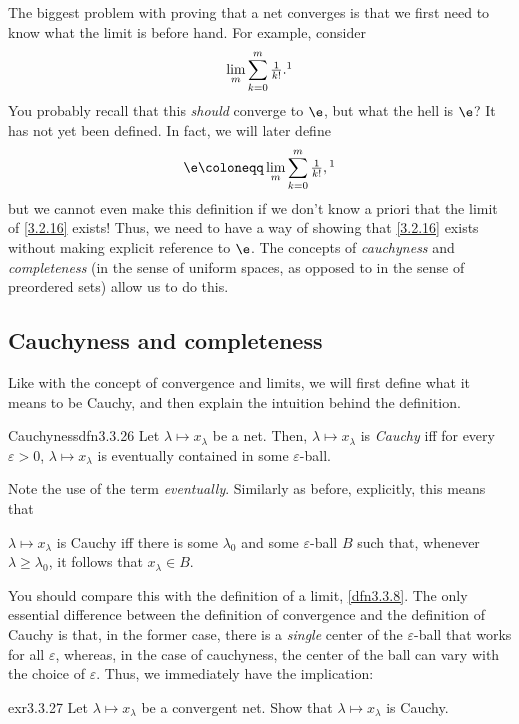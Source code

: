 The biggest problem with proving that a net converges is that we first need to know what the limit is before hand.  For example, consider
\begin{equation}\label{3.2.16}
\lim _m\sum _{k=0}^m\tfrac{1}{k!}.\footnotemark
\end{equation}
You probably recall that this \emph{should} converge to $\e$, but what the hell is $\e$?  It has not yet been defined.  In fact, we will later define
\begin{equation}
\e \coloneqq \lim _m\sum _{k=0}^m\tfrac{1}{k!},\footnotemark
\end{equation}
but we cannot even make this definition if we don't know a priori that the limit of \eqref{3.2.16} exists!  Thus, we need to have a way of showing that \eqref{3.2.16} exists without making explicit reference to $\e$.  The concepts of \emph{cauchyness} and \emph{completeness} (in the sense of uniform spaces, as opposed to in the sense of preordered sets) allow us to do this.

\subsection{Cauchyness and completeness}\label{sbs3.3.3}

Like with the concept of convergence and limits, we will first define what it means to be Cauchy, and then explain the intuition behind the definition.
\begin{dfn}{Cauchyness}{dfn3.3.26}
Let $\lambda \mapsto x_\lambda$ be a net.  Then, $\lambda \mapsto x_\lambda$ is \emph{Cauchy} iff for every $\varepsilon >0$, $\lambda \mapsto x_\lambda$ is eventually contained in some $\varepsilon$-ball.
\begin{rmk}
Note the use of the term \emph{eventually}.  Similarly as before, explicitly, this means that
\begin{textequation}
$\lambda \mapsto x_\lambda$ is Cauchy iff there is some $\lambda _0$ and some $\varepsilon$-ball $B$ such that, whenever $\lambda \geq \lambda _0$, it follows that $x_\lambda \in B$.
\end{textequation}
\end{rmk}
\end{dfn}
You should compare this with the definition of a limit, \cref{dfn3.3.8}.  The only essential difference between the definition of convergence and the definition of Cauchy is that, in the former case, there is a \emph{single} center of the $\varepsilon$-ball that works for all $\varepsilon$, whereas, in the case of cauchyness, the center of the ball can vary with the choice of $\varepsilon$.  Thus, we immediately have the implication:
\begin{exr}{}{exr3.3.27}
Let $\lambda \mapsto x_\lambda$ be a convergent net.  Show that $\lambda \mapsto x_\lambda$ is Cauchy.
\end{exr}

